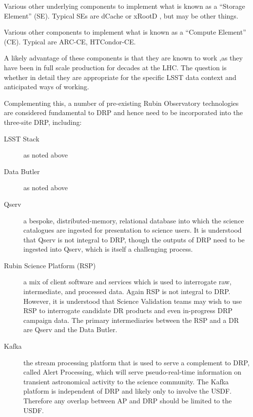 Various other underlying components to implement what is known as a “Storage Element” (SE). Typical SEs are dCache or xRootD , but may be other things.
  
Various other components to implement what is known as a “Compute Element”  (CE). Typical are ARC-CE, HTCondor-CE.

A likely advantage of these components is that they are known to work ,as they have been in full scale production for decades at the LHC. The question is whether in detail they are appropriate for the specific LSST data context and anticipated ways of working.

Complementing this, a number of pre-existing Rubin Observatory technologies are considered fundamental to DRP and hence need to be incorporated into the three-site DRP, including:

\begin{description}

\item[LSST Stack] as noted above

\item[Data Butler] as noted above
  
\item[Qserv] a bespoke, distributed-memory, relational database into which the science catalogues are ingested for presentation to science users. It is understood that Qserv is not integral to DRP, though the outputs of DRP need to be ingested into Qserv, which is itself a challenging process.
  
\item[Rubin Science Platform (RSP)] a mix of client software and services which is used to interrogate raw, intermediate, and processed data. Again RSP is not integral to DRP. However, it is understood that Science Validation teams may wish to use RSP to interrogate candidate DR products and even in-progress DRP campaign data. The primary intermediaries between the RSP and a DR are Qserv and the Data Butler.

\item [Kafka] the stream processing platform that is used to serve a complement to DRP, called Alert Processing, which will serve pseudo-real-time information on transient astronomical activity to the science community. The Kafka platform is independent of DRP and likely only to involve the USDF. Therefore any overlap between AP and DRP should be limited to the USDF.

\end{description}

